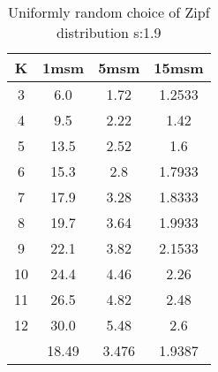 \begin{table}[H]
\centering
\begin{tabular}{c|ccc}
K &1msm &5msm &15msm\\
\hline
3 & 6.0 & 1.72 & 1.2533\\
4 & 9.5 & 2.22 & 1.42\\
5 & 13.5 & 2.52 & 1.6\\
6 & 15.3 & 2.8 & 1.7933\\
7 & 17.9 & 3.28 & 1.8333\\
8 & 19.7 & 3.64 & 1.9933\\
9 & 22.1 & 3.82 & 2.1533\\
10 & 24.4 & 4.46 & 2.26\\
11 & 26.5 & 4.82 & 2.48\\
12 & 30.0 & 5.48 & 2.6\\
\hline
& 18.49 & 3.476 & 1.9387\\
\end{tabular}
\caption{Uniformly random choice of Zipf distribution s:1.9}
\label{tab:s1.9}
\end{table}

